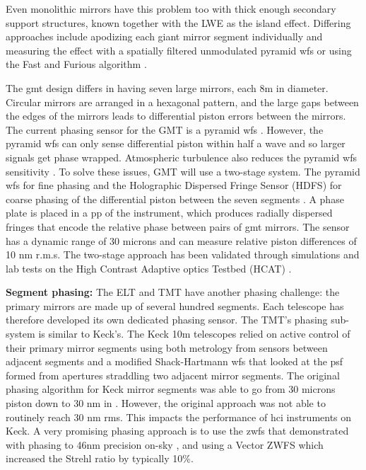 \documentclass[letterpaper]{ar-1col}
\begin{document}
Even monolithic mirrors have this problem too with thick enough secondary support structures, known together with the LWE as the island effect.
%
Differing approaches include apodizing each giant mirror segment individually \citep[Redundant Apodized Pupils; RAP ][]{Leboulleux22,Leboulleux22a} and  measuring the effect with a spatially filtered unmodulated pyramid \ac{wfs} \citep{Levraud24} or using the Fast and Furious algorithm  \citep[ demonstrated on Subaru/SCExAO in][]{Bos20}.

The \ac{gmt} design differs in having seven large mirrors, each 8m in diameter.
%
Circular mirrors are arranged in a hexagonal pattern, and the large gaps between the edges of the mirrors leads to differential piston errors between the mirrors.
% 
The current phasing sensor for the GMT is a pyramid \ac{wfs} \citep{Quiros-Pacheco22}.
%
However, the pyramid \ac{wfs} can only sense differential piston within half a wave and so larger signals get phase wrapped.
%
Atmospheric turbulence also reduces the pyramid \ac{wfs} sensitivity \citep{Bertrou-Cantou22}.
%
To solve these issues, GMT will use a two-stage system.
%
The pyramid \ac{wfs} for fine phasing and the Holographic Dispersed Fringe Sensor (HDFS) for coarse phasing of the differential piston between the seven segments \citet{Haffert22}.
%
A phase plate is placed in a \ac{pp} of the instrument, which produces radially dispersed fringes that encode the relative phase between pairs of \ac{gmt} mirrors.
%
The sensor has a dynamic range of 30 microns and can measure relative piston differences of 10 nm r.m.s.
%
The two-stage approach has been validated through simulations and lab tests on the High Contrast Adaptive optics Testbed (HCAT) \citep{Hedglen22, quiros2024giant}.

 {\bf Segment phasing: }
The ELT and TMT have another phasing challenge: the primary mirrors are made up of several hundred segments.
%
Each telescope has therefore developed its own dedicated phasing sensor.
%
The TMT's phasing sub-system is similar to Keck's.
The Keck 10m telescopes relied on active control of their primary mirror segments using both metrology from sensors between adjacent segments and a modified Shack-Hartmann \ac{wfs} that looked at the \ac{psf} formed from apertures straddling two adjacent mirror segments.
%
The original phasing algorithm for Keck mirror segments was able to go from 30 microns piston down to 30 nm in \citet{Chanan98,Chanan00}.
%
However, the original approach was not able to routinely reach 30 nm rms.
%
This impacts the performance of \ac{hci} instruments on Keck.
%
A very promising phasing approach is to use the \ac{zwfs} that demonstrated with phasing to 46nm precision on-sky \citep{vanKooten22}, and \citet{Salama24} using a Vector ZWFS which increased the Strehl ratio by typically 10\%.
\end{document}
